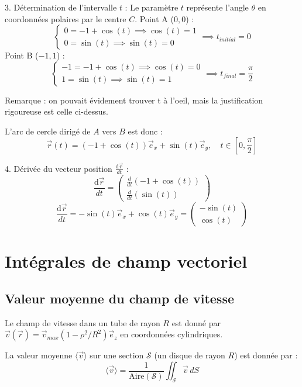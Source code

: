 \documentclass[french]{yLectureNote}
\renewcommand{\vec}{\overrightarrow}
\newcommand{\dd}{\mathrm{d}}
\begin{document}
3.  Détermination de l'intervalle $t$ :
    Le paramètre $t$ représente l'angle $\theta$ en coordonnées polaires par le centre $C$.
    Point A ($0, 0$) :
        $$\begin{cases} 0 = -1 + \cos(t) \implies \cos(t) = 1 \\ 0 = \sin(t) \implies \sin(t) = 0 \end{cases} \implies t_{initial} = 0$$
    Point B ($-1, 1$) :
        $$\begin{cases} -1 = -1 + \cos(t) \implies \cos(t) = 0 \\ 1 = \sin(t) \implies \sin(t) = 1 \end{cases} \implies t_{final} = \frac{\pi}{2}$$

Remarque : on pouvait évidement trouver t à l'oeil, mais la justification rigoureuse est celle ci-dessus.

    L'arc de cercle dirigé de $A$ vers $B$ est donc :
    $$\vec{r}(t) = (-1 + \cos(t)) \vec{e}_x + \sin(t) \vec{e}_y, \quad t \in [0, \frac{\pi}{2}]$$

4.  Dérivée du vecteur position $\frac{\dd\vec{r}}{dt}$ :
    $$\frac{\dd\vec{r}}{dt} = \begin{pmatrix} \frac{d}{dt}(-1 + \cos(t)) \\ \frac{d}{dt}(\sin(t)) \end{pmatrix}$$
    $$\frac{\dd\vec{r}}{dt} = - \sin(t) \vec{e}_x + \cos(t) \vec{e}_y = \begin{pmatrix} -\sin(t) \\ \cos(t) \end{pmatrix}$$
\section{Intégrales de champ vectoriel}
\subsection{Valeur moyenne du champ de vitesse}
Le champ de vitesse dans un tube de rayon $R$ est donné par $\vec{v}(\vec{r})=\vec{v}_{max}(1-\rho^{2}/R^{2})\vec{e}_z$ en coordonnées cylindriques.

La valeur moyenne $\langle \vec{v} \rangle$ sur une section $\mathcal{S}$ (un disque de rayon $R$) est donnée par :
$$\langle \vec{v} \rangle = \frac{1}{\text{Aire}(\mathcal{S})} \iint_{\mathcal{S}} \vec{v} \, dS$$
\end{document}
